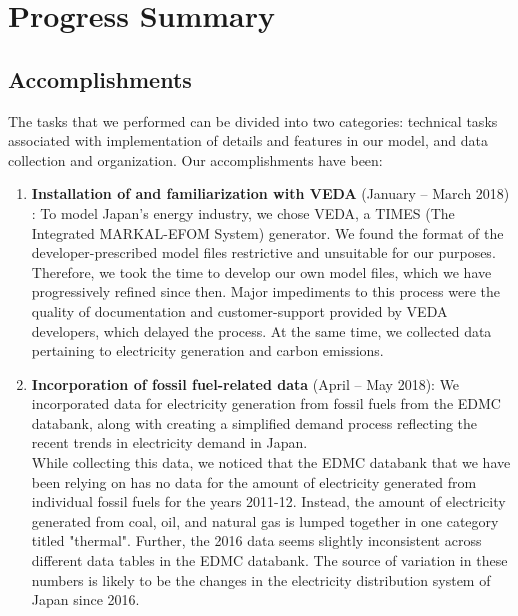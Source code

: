 \documentclass[14pt,a4paper]{article} %
\begin{document}
\section{Progress Summary}

\subsection{Accomplishments}

The tasks that we performed can be divided into two categories: technical tasks associated with implementation of details and features in our model, and data collection and organization. Our accomplishments have been:

\begin{enumerate}
\item \textbf{Installation of and familiarization with VEDA} (January – March 2018) : To model Japan's energy industry, we chose VEDA, a TIMES (The Integrated MARKAL-EFOM System) \cite{loulou_documentation_2005} \cite{gargiulo_documentation_2005} generator. We found the format of the developer-prescribed model files restrictive and unsuitable for our purposes. Therefore, we took the time to develop our own model files, which we have progressively refined since then. Major impediments to this process were the quality of documentation and customer-support provided by VEDA developers, which delayed the process.
At the same time, we collected data pertaining to electricity generation and carbon emissions.

\item \textbf{Incorporation of fossil fuel-related data} (April – May 2018): We incorporated data for electricity generation from fossil fuels from the EDMC databank\cite{noauthor_energy_2018}, along with creating a simplified demand process reflecting the recent trends in electricity demand in Japan. \\

While collecting this data, we noticed that the EDMC databank that we have been relying on has no data for the amount of electricity generated from individual fossil fuels for the years 2011-12. Instead, the amount of electricity generated from coal, oil, and natural gas is lumped together in one category titled "thermal". Further, the 2016 data seems slightly inconsistent across different data tables in the EDMC databank. The source of variation in these numbers is likely to be the changes in the electricity distribution system of Japan since 2016.


\end{enumerate}
\end{document}
